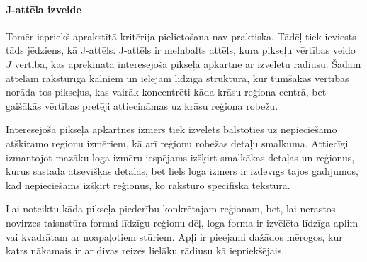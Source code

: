 \documentclass[12pt,paper=a4]{report}
\begin{document}
\paragraph{J-attēla izveide}Tomēr iepriekš aprakstītā kritērija pielietošana nav praktiska. Tādēļ tiek ieviests tāds jēdziens, kā J-attēls. J-attēls ir melnbalts attēls, kura pikseļu vērtības veido $J$ vērtība, kas aprēķināta interesējošā pikseļa apkārtnē ar izvēlētu rādiusu. Šādam attēlam raksturīga kalniem un ielejām līdzīga struktūra, kur tumšākās vērtības norāda tos pikseļus, kas vairāk koncentrēti kāda krāsu reģiona centrā, bet gaišākās vērtības pretēji attiecināmas uz krāsu reģiona robežu.\cite{2unsupImSegm2001}\par
Interesējošā pikseļa apkārtnes izmērs tiek izvēlēts balstoties uz nepieciešamo atšķiramo reģionu izmēriem, kā arī reģionu robežas detaļu smalkuma. Attiecīgi izmantojot mazāku loga izmēru iespējams izšķirt smalkākas detaļas un reģionus, kurus sastāda atsevišķas detaļas, bet liels loga izmērs ir izdevīgs tajos gadījumos, kad nepieciešams izšķirt reģionus, ko raksturo specifiska tekstūra. \cite{1colImSegm1999}\par
Lai noteiktu kāda pikseļa piederību konkrētajam reģionam, bet, lai nerastos novirzes taisnstūra formai līdzīgu reģionu dēļ, loga forma ir izvēlēta līdzīga aplim vai kvadrātam ar noapaļotiem stūriem. Apļi ir pieejami dažādos mērogos, kur katrs nākamais ir ar divas reizes lielāku rādiusu kā iepriekšējais. \cite{1colImSegm1999}\par
\end{document}

